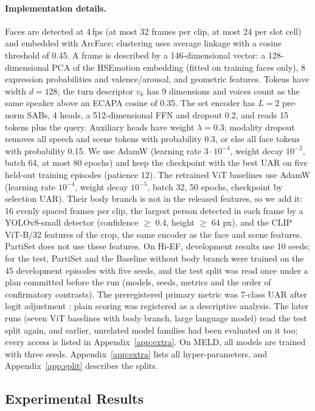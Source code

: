 \documentclass[11pt]{article}
\newcommand{\model}{PartiSet}
\begin{document}
\paragraph{Implementation details.} Faces are detected at 4\,fps (at most 32 frames per clip, at most 24 per slot
cell) and embedded with ArcFace; clustering uses average linkage with a cosine threshold of 0.45. A frame is
described by a 146-dimensional vector: a 128-dimensional PCA of the HSEmotion embedding (fitted on training faces
only), 8 expression probabilities and valence/arousal, and geometric features. Tokens have width $d=128$; the turn
descriptor $v_k$ has 9 dimensions and voices count as the same speaker above an ECAPA cosine of 0.35. The set encoder
has $L=2$ pre-norm SABs, 4 heads, a 512-dimensional FFN and dropout 0.2, and reads 15 tokens plus the query. Auxiliary
heads have weight $\lambda=0.3$; modality dropout removes all speech and scene tokens with probability 0.3, or else all
face tokens with probability 0.15. We use AdamW (learning rate $3\cdot10^{-4}$, weight decay $10^{-2}$, batch 64, at
most 80 epochs) and keep the checkpoint with the best UAR on five held-out training episodes (patience 12). The
retrained ViT baselines use AdamW (learning rate $10^{-4}$, weight decay $10^{-5}$, batch 32, 50 epochs, checkpoint by
selection UAR). Their body branch is not in the released features, so we add it:
16 evenly spaced frames per clip, the largest person detected in each frame by a YOLOv8-small detector
(confidence $\geq$ 0.4, height $\geq$ 64 px), and the CLIP ViT-B/32 features of the crop, the same encoder as the face and
scene features. \model{} does not use these features. On
Hi-EF, development results use 10 seeds; for the test, \model{} and the Baseline without body branch were trained on the
45 development episodes with five seeds, and the test split was read once under a plan committed before the run (models,
seeds, metrics and the order of confirmatory contrasts). The preregistered primary metric was 7-class UAR after logit
adjustment \citep{menon2021logit}; plain scoring was registered as a descriptive analysis. The later runs (seven ViT
baselines with body branch, large language model) read the test split again, and earlier, unrelated model families had
been evaluated on it too; every access is listed in Appendix~\ref{app:extra}. On MELD, all models are trained with three
seeds. Appendix~\ref{app:extra} lists all hyper-parameters, and Appendix~\ref{app:split} describes the splits.

\subsection{Experimental Results}
\label{sec:main}
\end{document}

